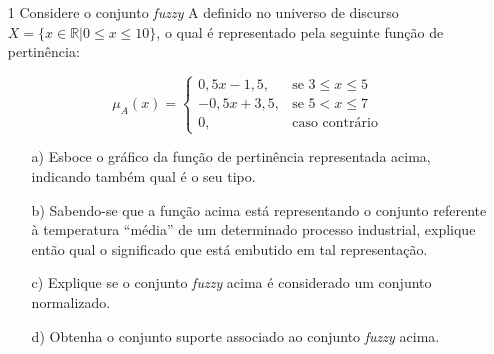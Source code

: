 \documentclass{report}
\begin{document}
\newpage

\begin{enumerate}

\item[1] Considere o conjunto \emph{fuzzy} A definido no universo de discurso $X = \{ x \in  \mathbb{R} \vert 0 \le x \le 10\}$,
o qual é representado pela seguinte função de pertinência:


\begin{equation*}
\mu_A (x) = 
\begin{cases} 
0,5x-1,5, & \text{se $3 \leq x \leq 5$}
\\
-0,5x+3,5, & \text{se $5 < x \leq 7$}
\\
0, &\text{caso contrário}
\end{cases}
\end{equation*}

\begin{enumerate}
    \item[a)] Esboce o gráfico da função de pertinência representada acima, indicando também qual é o seu tipo.
    \item[b)] Sabendo-se que a função acima está representando o conjunto referente à temperatura ``média'' de um determinado
    processo industrial, explique então qual o significado que está embutido em tal representação.
    \item[c)] Explique se o conjunto \emph{fuzzy} acima é considerado um conjunto normalizado.
    \item[d)] Obtenha o conjunto suporte associado ao conjunto \emph{fuzzy} acima.
\end{enumerate}


\end{enumerate}
\end{document}

